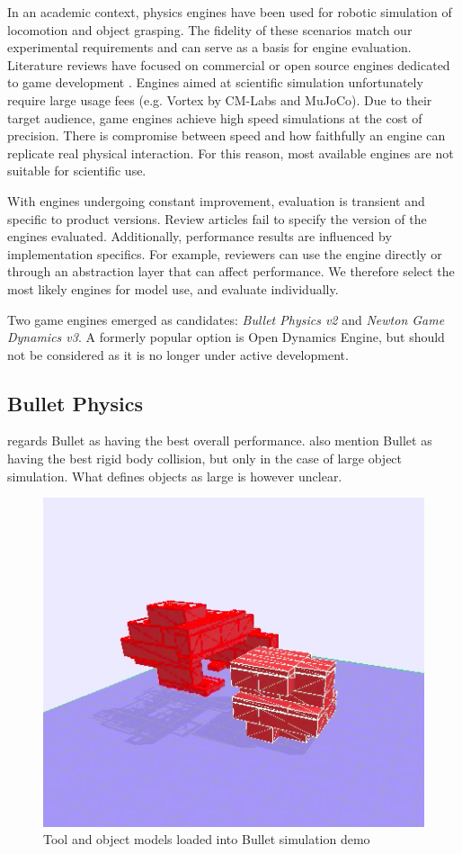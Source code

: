 \documentclass[11]{article}
\begin{document}
In an academic context, physics engines have been used for robotic simulation of locomotion and object grasping.
The fidelity of these scenarios match our experimental requirements and can serve as a basis for engine evaluation. 
Literature reviews have focused on commercial or open source engines dedicated to game development \cite{boeing2007,roennau2013,hummel2012}. 
Engines aimed at scientific simulation unfortunately require large usage fees (e.g. Vortex by CM-Labs and MuJoCo).
Due to their target audience, game engines achieve high speed simulations at the cost of precision. 
There is compromise between speed and how faithfully an engine can replicate real physical interaction.
For this reason, most available engines are not suitable for scientific use. 

With engines undergoing constant improvement, evaluation is transient and specific to product versions. 
Review articles fail to specify the version of the engines evaluated.
Additionally, performance results are influenced by implementation specifics.
For example, reviewers can use the engine directly or through an abstraction layer that can affect performance.  
We therefore select the most likely engines for model use, and evaluate individually. 

Two game engines emerged as candidates: \emph{Bullet Physics v2} and \emph{Newton Game Dynamics v3}.
A formerly popular option is Open Dynamics Engine, but should not be considered as it is no longer under active development. 

\subsection{Bullet Physics}
\cite{boeing2007} regards Bullet as having the best overall performance. 
\cite{hummel2012,roennau2013} also mention Bullet as having the best rigid body collision, but only in the case of large object simulation.
What defines objects as large is however unclear. 

\begin{figure}[h]
  \centering
  \includegraphics[width=.5\textwidth]{figures/bullet_demo.png}
  \caption{Tool and object models loaded into Bullet simulation demo}
  \label{fig:bullet_demo}
\end{figure}      
\end{document}
